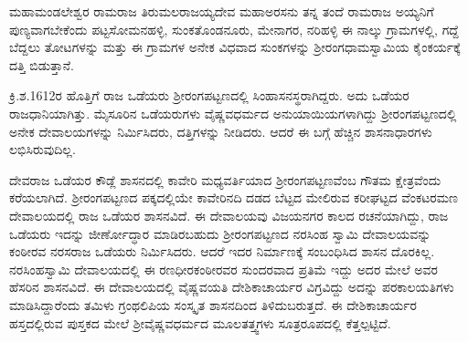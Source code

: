 ಮಹಾಮಂಡಲೇಶ್ವರ ರಾಮರಾಜ ತಿರುಮಲರಾಜಯ್ಯದೇವ ಮಹಾಅರಸನು ತನ್ನ ತಂದೆ ರಾಮರಾಜ ಅಯ್ಯನಿಗೆ ಪುಣ್ಯವಾಗಬೇಕೆಂದು ಪಟ್ಟಸೋಮನಹಳ್ಳಿ, ಸುಂಕತೊಂಡನೂರು, ಮೇನಾಗರ, ನರಿಹಳ್ಳಿ ಈ ನಾಲ್ಕು ಗ್ರಾಮಗಳಲ್ಲಿ, ಗದ್ದೆ ಬೆದ್ದಲು ತೋಟಗಳನ್ನು ಮತ್ತು ಈ ಗ್ರಾಮಗಳ ಅನೇಕ ವಿಧವಾದ ಸುಂಕಗಳನ್ನು ಶ‍್ರೀರಂಗಧಾಮಸ್ವಾಮಿಯ ಕೈಂಕರ್ಯಕ್ಕೆ ದತ್ತಿ ಬಿಡುತ್ತಾನೆ.

ಕ್ರಿ.ಶ.1612ರ ಹೊತ್ತಿಗೆ ರಾಜ ಒಡೆಯರು ಶ‍್ರೀರಂಗಪಟ್ಟಣದಲ್ಲಿ ಸಿಂಹಾಸನಸ್ಥರಾಗಿದ್ದರು. ಅದು ಒಡೆಯರ ರಾಜಧಾನಿಯಾಗಿತ್ತು. ಮೈಸೂರಿನ ಒಡೆಯರುಗಳು ವೈಷ್ಣವಧರ್ಮದ ಅನುಯಾಯಿಯಗಳಾಗಿದ್ದು ಶ‍್ರೀರಂಗಪಟ್ಟಣದಲ್ಲಿ ಅನೇಕ ದೇವಾಲಯಗಳನ್ನು ನಿರ್ಮಿಸಿದರು, ದತ್ತಿಗಳನ್ನು ನೀಡಿದರು. ಆದರೆ ಈ ಬಗ್ಗೆ ಹೆಚ್ಚಿನ ಶಾಸನಾಧಾರಗಳು ಲಭಿಸಿರುವುದಿಲ್ಲ.

ದೇವರಾಜ ಒಡೆಯರ ಕೌಡ್ಲೆ ಶಾಸನದಲ್ಲಿ ಕಾವೇರಿ ಮಧ್ಯವರ್ತಿಯಾದ ಶ‍್ರೀರಂಗಪಟ್ಟಣವೆಂಬ ಗೌತಮ ಕ್ಷೇತ್ರವೆಂದು ಕರೆಯಲಾಗಿದೆ. ಶ‍್ರೀರಂಗಪಟ್ಟಣದ ಪಕ್ಕದಲ್ಲಿಯೇ ಕಾವೇರಿನದಿ ದಡದ ಬೆಟ್ಟದ ಮೇಲಿರುವ ಕರೀಘಟ್ಟದ ವೆಂಕಟರಮಣ ದೇವಾಲಯದಲ್ಲಿ ರಾಜ ಒಡೆಯರ ಶಾಸನವಿದೆ. ಈ ದೇವಾಲಯವು ವಿಜಯನಗರ ಕಾಲದ ರಚನೆಯಾಗಿದ್ದು, ರಾಜ ಒಡೆಯರು ಇದನ್ನು ಜೀರ್ಣೋದ್ಧಾರ ಮಾಡಿರಬಹುದು ಶ‍್ರೀರಂಗಪಟ್ಟಣದ ನರಸಿಂಹ ಸ್ವಾಮಿ ದೇವಾಲಯವನ್ನು ಕಂಠೀರವ ನರಸರಾಜ ಒಡೆಯರು ನಿರ್ಮಿಸಿದರು. ಆದರೆ ಇದರ ನಿರ್ಮಾಣಕ್ಕೆ ಸಂಬಂಧಿಸಿದ ಶಾಸನ ದೊರಕಿಲ್ಲ. ನರಸಿಂಹಸ್ವಾಮಿ ದೇವಾಲಯದಲ್ಲಿ ಈ ರಣಧೀರಕಂಠೀರವರ ಸುಂದರವಾದ ಪ್ರತಿಮೆ ಇದ್ದು ಅದರ ಮೇಲೆ ಅವರ ಹೆಸರಿನ ಶಾಸನವಿದೆ. ಈ ದೇವಾಲಯದಲ್ಲಿ ವೈಷ್ಣವಯತಿ ದೇಶಿಕಾಚಾರ್ಯರ ವಿಗ್ರವಿದ್ದು ಅದನ್ನು ಪರಕಾಲಯತಿಗಳು ಮಾಡಿಸಿದ್ದಾರೆಂದು ತಮಿಳು ಗ್ರಂಥಲಿಪಿಯ ಸಂಸ್ಕೃತ ಶಾಸನದಿಂದ ತಿಳಿದುಬರುತ್ತದೆ. ಈ ದೇಶಿಕಾಚಾರ್ಯರ ಹಸ್ತದಲ್ಲಿರುವ ಪುಸ್ತಕದ ಮೇಲೆ ಶ‍್ರೀವೈಷ್ಣವಧರ್ಮದ ಮೂಲತತ್ತ್ವಗಳು ಸೂತ್ರರೂಪದಲ್ಲಿ ಕೆತ್ತಲ್ಪಟ್ಟಿದೆ.

